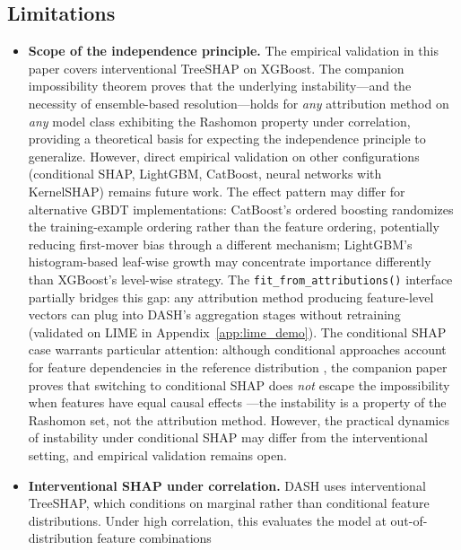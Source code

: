 \documentclass[11pt]{article}
\newcommand{\dash}{\textsc{DASH}}
\begin{document}
\subsection{Limitations}

\begin{itemize}
  \item \textbf{Scope of the independence principle.} The empirical
    validation in this paper covers interventional TreeSHAP on XGBoost.
    The companion impossibility theorem
    \citep{caraker2026impossibility} proves that the underlying
    instability---and the necessity of ensemble-based resolution---holds
    for \emph{any} attribution method on \emph{any} model class
    exhibiting the Rashomon property under correlation, providing a
    theoretical basis for expecting the independence principle to
    generalize.  However, direct empirical validation on other
    configurations (conditional SHAP, LightGBM, CatBoost, neural
    networks with KernelSHAP) remains future work.  The effect pattern
    may differ for alternative GBDT implementations: CatBoost's ordered
    boosting randomizes the training-example ordering rather than the
    feature ordering, potentially reducing first-mover bias through a
    different mechanism; LightGBM's histogram-based leaf-wise growth may
    concentrate importance differently than XGBoost's level-wise strategy.
    The
    \texttt{fit\_from\_attributions()} interface partially bridges this
    gap: any attribution method producing feature-level vectors can
    plug into \dash{}'s aggregation stages without retraining
    (validated on LIME in Appendix~\ref{app:lime_demo}).
    The conditional SHAP case warrants particular attention: although
    conditional approaches account for feature dependencies in the
    reference distribution \citep{aas2021explaining}, the companion
    paper proves that switching to conditional SHAP does \emph{not}
    escape the impossibility when features have equal causal effects
    \citep{caraker2026impossibility}---the instability is a property of
    the Rashomon set, not the attribution method.  However, the
    practical dynamics of instability under conditional SHAP may differ
    from the interventional setting, and empirical validation remains
    open.
  \item \textbf{Interventional SHAP under correlation.} DASH uses
    interventional TreeSHAP, which conditions on marginal rather than
    conditional feature distributions. Under high correlation, this
    evaluates the model at out-of-distribution feature combinations

\end{itemize}
\end{document}

